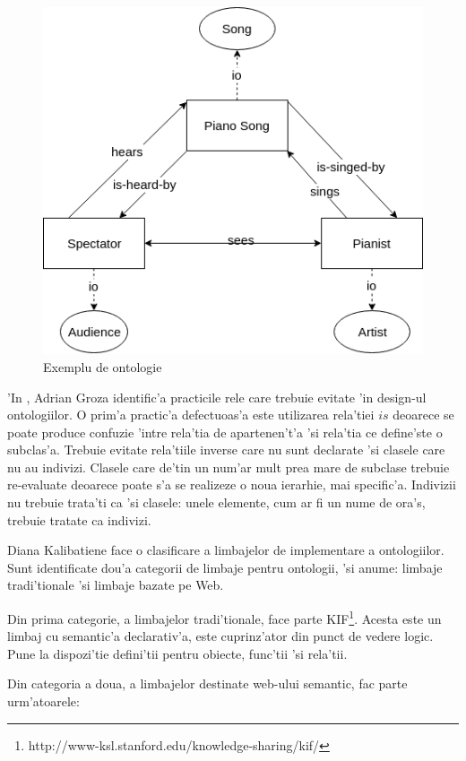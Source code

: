 \documentclass[12pt,a4paper,twoside]{report}
\begin{document}
\begin{figure}
    \centering
    \includegraphics[width = 0.6\linewidth]{img/onto_example.png}
        \caption{Exemplu de ontologie}
    \label{fig:onto_ex}
\end{figure}

'In \cite{Press2014AdrianApproach}, Adrian Groza identific'a practicile rele care trebuie evitate 'in design-ul ontologiilor. O prim'a practic'a defectuoas'a este utilizarea rela'tiei $is$ deoarece se poate produce confuzie 'intre rela'tia de apartenen't'a 'si rela'tia ce define'ste o subclas'a. Trebuie evitate rela'tiile inverse care nu sunt declarate 'si clasele care nu au indivizi. Clasele care de'tin un num'ar mult prea mare de subclase trebuie re-evaluate deoarece poate s'a se realizeze o noua ierarhie, mai specific'a. Indivizii nu trebuie trata'ti ca 'si clasele: unele elemente, cum ar fi un nume de ora's, trebuie tratate ca indivizi.

Diana Kalibatiene \cite{owl_languages} face o clasificare a limbajelor de implementare a ontologiilor. Sunt identificate dou'a categorii de limbaje pentru ontologii, 'si anume: limbaje tradi'tionale 'si limbaje bazate pe Web. 

Din prima categorie, a limbajelor tradi'tionale, face parte KIF\footnote{http://www-ksl.stanford.edu/knowledge-sharing/kif/}. Acesta este un limbaj cu semantic'a declarativ'a, este cuprinz'ator din punct de vedere logic. Pune la dispozi'tie defini'tii pentru obiecte, func'tii 'si rela'tii.

Din categoria a doua, a limbajelor destinate web-ului semantic, fac parte urm'atoarele:
\end{document}
